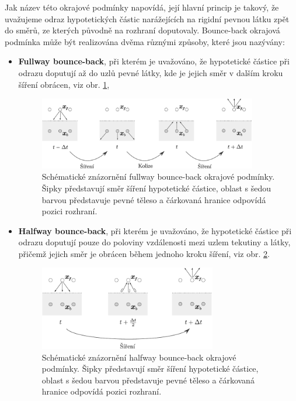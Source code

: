 Jak název této okrajové podmínky napovídá, její hlavní princip je takový, že uvažujeme odraz hypotetických částic narážejících na rigidní pevnou látku zpět do směrů, ze kterých původně na rozhraní doputovaly. Bounce-back okrajová podmínka může být realizována dvěma různými způsoby, které jsou nazývány:
\begin{itemize}
	\item \textbf{Fullway bounce-back}, při kterém je uvažováno, že hypotetické částice při odrazu doputují až do uzlů pevné látky, kde je jejich směr v dalším kroku šíření obrácen, viz obr. \ref{fig:bbfw},
	\begin{figure}[h]
		\centering
		\vspace{2mm}
		\hspace{7mm}
		\includegraphics[width=0.9\textwidth]{Images/bbfw.pdf}
		\vspace{2.8mm}
		\caption{Schématické znázornění fullway bounce-back okrajové podmínky. Šipky představují směr šíření hypotetické částice, oblast s šedou barvou představuje pevné těleso a čárkovaná hranice odpovídá pozici rozhraní.}
		\label{fig:bbfw}
		\vspace{1.8mm}
	\end{figure}
	\item \textbf{Halfway bounce-back}, při kterém je uvažováno, že hypotetické částice při odrazu doputují pouze do poloviny vzdálenosti mezi uzlem tekutiny a látky, přičemž jejich směr je obrácen během jednoho kroku šíření, viz obr. \ref{fig:bbhw}.
	\begin{figure}[h]
		\centering
		\vspace{2mm}
		\includegraphics[width=0.73\textwidth]{Images/bbhw.pdf}
		\vspace{1.8mm}
		\caption{Schématické znázornění halfway bounce-back okrajové podmínky. Šipky představují směr šíření hypotetické částice, oblast s šedou barvou představuje pevné těleso a čárkovaná hranice odpovídá pozici rozhraní.}
		\label{fig:bbhw}
		\vspace{1.8mm}
	\end{figure}
\end{itemize}
